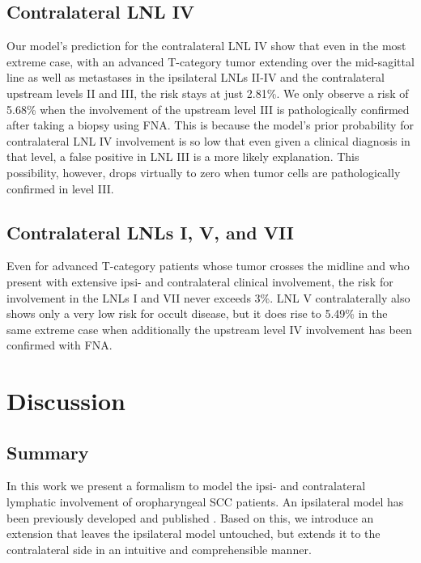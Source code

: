 \documentclass[
  sn-mathphys-num,
]{sn-jnl}
\begin{document}
\subsection{Contralateral LNL IV}\label{contralateral-lnl-iv}

Our model's prediction for the contralateral LNL IV show that even in
the most extreme case, with an advanced T-category tumor extending over
the mid-sagittal line as well as metastases in the ipsilateral LNLs
II-IV and the contralateral upstream levels II and III, the risk stays
at just 2.81\%. We only observe a risk of 5.68\% when the involvement of
the upstream level III is pathologically confirmed after taking a biopsy
using FNA. This is because the model's prior probability for
contralateral LNL IV involvement is so low that even given a clinical
diagnosis in that level, a false positive in LNL III is a more likely
explanation. This possibility, however, drops virtually to zero when
tumor cells are pathologically confirmed in level III.

\subsection{Contralateral LNLs I, V, and
VII}\label{contralateral-lnls-i-v-and-vii}

Even for advanced T-category patients whose tumor crosses the midline
and who present with extensive ipsi- and contralateral clinical
involvement, the risk for involvement in the LNLs I and VII never
exceeds 3\%. LNL V contralaterally also shows only a very low risk for
occult disease, but it does rise to 5.49\% in the same extreme case when
additionally the upstream level IV involvement has been confirmed with
FNA.

\section{Discussion}\label{sec-discussion}

\subsection{Summary}\label{summary}

In this work we present a formalism to model the ipsi- and contralateral
lymphatic involvement of oropharyngeal SCC patients. An ipsilateral
model has been previously developed and published
\citep{ludwig_hidden_2021, ludwig_modelling_2023}. Based on this, we
introduce an extension that leaves the ipsilateral model untouched, but
extends it to the contralateral side in an intuitive and comprehensible
manner.
\end{document}
